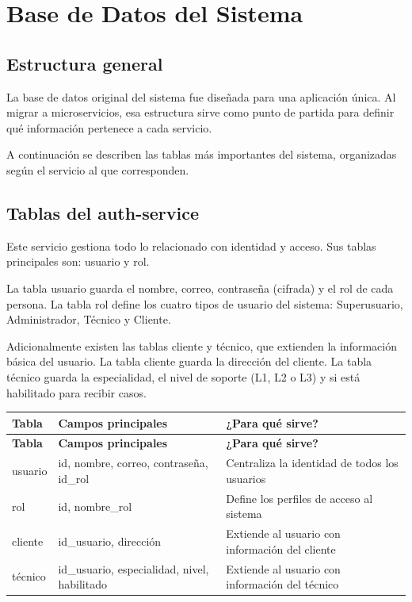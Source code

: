 \documentclass[12pt, a4paper]{report}
\begin{document}
\newpage

\chapter{Base de Datos del Sistema}


\section{Estructura general}

La base de datos original del sistema fue diseñada para una aplicación
única. Al migrar a microservicios, esa estructura sirve como punto de
partida para definir qué información pertenece a cada servicio.

A continuación se describen las tablas más importantes del sistema,
organizadas según el servicio al que corresponden.

\section{Tablas del auth-service}

Este servicio gestiona todo lo relacionado con identidad y acceso.
Sus tablas principales son: usuario y rol.

La tabla usuario guarda el nombre, correo, contraseña
(cifrada) y el rol de cada persona. La tabla rol define
los cuatro tipos de usuario del sistema: Superusuario, Administrador,
Técnico y Cliente.

Adicionalmente existen las tablas cliente y técnico,
que extienden la información básica del usuario. La tabla cliente
guarda la dirección del cliente. La tabla técnico guarda la
especialidad, el nivel de soporte (L1, L2 o L3) y si está habilitado
para recibir casos.

\begin{longtable}{|p{3.5cm}|p{4cm}|p{5cm}|}
\hline
\textbf{Tabla} & \textbf{Campos principales} & \textbf{¿Para qué sirve?} \\
\hline
\endfirsthead
\hline
\textbf{Tabla} & \textbf{Campos principales} & \textbf{¿Para qué sirve?} \\
\hline
\endhead
usuario &
id, nombre, correo, contraseña, id\_rol &
Centraliza la identidad de todos los usuarios \\
\hline
rol &
id, nombre\_rol &
Define los perfiles de acceso al sistema \\
\hline
cliente &
id\_usuario, dirección &
Extiende al usuario con información del cliente \\
\hline
técnico &
id\_usuario, especialidad, nivel, habilitado &
Extiende al usuario con información del técnico \\
\hline
\end{longtable}
\end{document}
